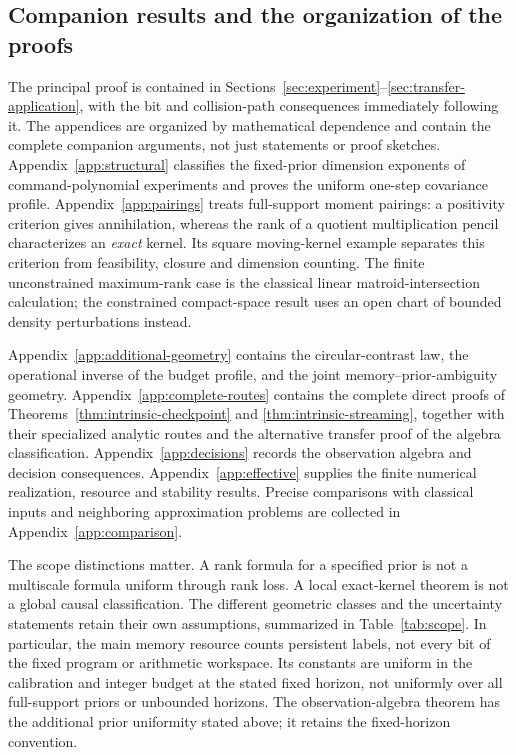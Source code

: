 \subsection{Companion results and the organization of the proofs}
The principal proof is contained in Sections~\ref{sec:experiment}--\ref{sec:transfer-application},
with the bit and collision-path consequences immediately following it.
The appendices are organized by mathematical dependence and contain the
complete companion arguments, not just statements or proof sketches.
Appendix~\ref{app:structural} classifies the fixed-prior dimension
exponents of command-polynomial experiments and proves the uniform
one-step covariance profile. Appendix~\ref{app:pairings} treats
full-support moment pairings: a positivity criterion gives annihilation,
whereas the rank of a quotient multiplication pencil characterizes an
\emph{exact} kernel. Its square moving-kernel example separates this
criterion from feasibility, closure and dimension counting. The finite
unconstrained maximum-rank case is the classical linear
matroid-intersection calculation; the constrained compact-space result
uses an open chart of bounded density perturbations instead.

Appendix~\ref{app:additional-geometry} contains the circular-contrast
law, the operational inverse of the budget profile, and the joint
memory--prior-ambiguity geometry. Appendix~\ref{app:complete-routes}
contains the complete direct proofs of
Theorems~\ref{thm:intrinsic-checkpoint} and
\ref{thm:intrinsic-streaming}, together with their specialized analytic routes and the alternative
transfer proof of the algebra classification.
Appendix~\ref{app:decisions} records the observation algebra and decision
consequences. Appendix~\ref{app:effective} supplies the finite numerical
realization, resource and stability results. Precise comparisons with
classical inputs and neighboring approximation problems are collected
in Appendix~\ref{app:comparison}.

The scope distinctions matter. A rank formula for a specified prior
is not a multiscale formula uniform through rank loss. A local
exact-kernel theorem is not a global causal classification. The
different geometric classes and the uncertainty statements retain their
own assumptions, summarized in Table~\ref{tab:scope}. In particular,
the main memory resource counts persistent labels, not every bit of
the fixed program or arithmetic workspace. Its constants are uniform
in the calibration and integer budget at the stated fixed horizon,
not uniformly over all full-support priors or unbounded horizons.
The observation-algebra theorem has the additional prior uniformity
stated above; it retains the fixed-horizon convention.

